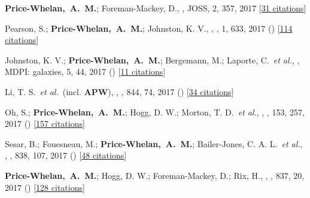 {\item[{\color{deemph}\scriptsize30}]\textbf{Price-Whelan,~A.~M.}; Foreman-Mackey, D., , JOSS, 2, 357, 2017 [\href{http://adsabs.harvard.edu/abs/2017JOSS....2..357P}{31 citations}]

\item[{\color{deemph}\scriptsize29}]Pearson, S.; \textbf{Price-Whelan,~A.~M.}; Johnston, K. V., , \natureast, 1, 633, 2017 () [\href{http://adsabs.harvard.edu/abs/2017NatAs...1..633P}{114 citations}]

\item[{\color{deemph}\scriptsize28}]Johnston, K. V.; \textbf{Price-Whelan,~A.~M.}; Bergemann, M.; Laporte, C.~\textit{et al.}, , MDPI: galaxies, 5, 44, 2017 () [\href{http://adsabs.harvard.edu/abs/2017Galax...5...44J}{11 citations}]

\item[{\color{deemph}\scriptsize27}]Li, T. S.~\textit{et al.}~(incl. \textbf{APW}), , \apj, 844, 74, 2017 () [\href{http://adsabs.harvard.edu/abs/2017ApJ...844...74L}{34 citations}]

\item[{\color{deemph}\scriptsize26}]Oh, S.; \textbf{Price-Whelan,~A.~M.}; Hogg, D. W.; Morton, T. D.~\textit{et al.}, , \aj, 153, 257, 2017 () [\href{http://adsabs.harvard.edu/abs/2017AJ....153..257O}{157 citations}]

\item[{\color{deemph}\scriptsize25}]Sesar, B.; Fouesneau, M.; \textbf{Price-Whelan,~A.~M.}; Bailer-Jones, C. A. L.~\textit{et al.}, , \apj, 838, 107, 2017 () [\href{http://adsabs.harvard.edu/abs/2017ApJ...838..107S}{48 citations}]

\item[{\color{deemph}\scriptsize24}]\textbf{Price-Whelan,~A.~M.}; Hogg, D. W.; Foreman-Mackey, D.; Rix, H., , \apj, 837, 20, 2017 () [\href{http://adsabs.harvard.edu/abs/2017ApJ...837...20P}{128 citations}]

}
